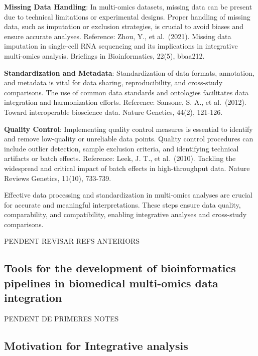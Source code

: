 \documentclass[a4paper, nobind]{templates/ociamthesis}
\begin{document}
\textbf{Missing Data Handling}: In multi-omics datasets, missing data can be present due to technical limitations or experimental designs. Proper handling of missing data, such as imputation or exclusion strategies, is crucial to avoid biases and ensure accurate analyses. Reference: Zhou, Y., et al.~(2021). Missing data imputation in single-cell RNA sequencing and its implications in integrative multi-omics analysis. Briefings in Bioinformatics, 22(5), bbaa212.

\textbf{Standardization and Metadata}: Standardization of data formats, annotation, and metadata is vital for data sharing, reproducibility, and cross-study comparisons. The use of common data standards and ontologies facilitates data integration and harmonization efforts. Reference: Sansone, S. A., et al.~(2012). Toward interoperable bioscience data. Nature Genetics, 44(2), 121-126.

\textbf{Quality Control}: Implementing quality control measures is essential to identify and remove low-quality or unreliable data points. Quality control procedures can include outlier detection, sample exclusion criteria, and identifying technical artifacts or batch effects. Reference: Leek, J. T., et al.~(2010). Tackling the widespread and critical impact of batch effects in high-throughput data. Nature Reviews Genetics, 11(10), 733-739.

Effective data processing and standardization in multi-omics analyses are crucial for accurate and meaningful interpretations. These steps ensure data quality, comparability, and compatibility, enabling integrative analyses and cross-study comparisons.

PENDENT REVISAR REFS ANTERIORS

\hypertarget{tools-for-the-development-of-bioinformatics-pipelines-in-biomedical-multi-omics-data-integration}{%
\subsection{Tools for the development of bioinformatics pipelines in biomedical multi-omics data integration}\label{tools-for-the-development-of-bioinformatics-pipelines-in-biomedical-multi-omics-data-integration}}

PENDENT DE PRIMERES NOTES

\hypertarget{motivation-for-integrative-analysis}{%
\subsection{Motivation for Integrative analysis}\label{motivation-for-integrative-analysis}}
\end{document}
